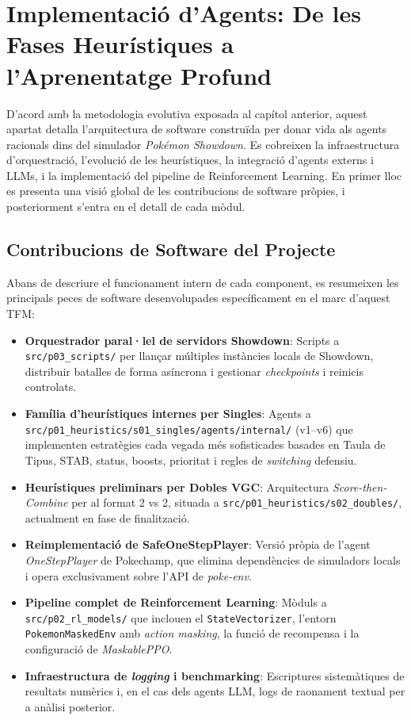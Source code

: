 \chapter{Implementació d'Agents: De les Fases Heurístiques a l'Aprenentatge Profund}
\label{chap:implementacio}

D'acord amb la metodologia evolutiva exposada al capítol anterior, aquest apartat detalla l'arquitectura de software construïda per donar vida als agents racionals dins del simulador \textit{Pokémon Showdown}. Es cobreixen la infraestructura d'orquestració, l'evolució de les heurístiques, la integració d'agents externs i LLMs, i la implementació del pipeline de Reinforcement Learning. En primer lloc es presenta una visió global de les contribucions de software pròpies, i posteriorment s'entra en el detall de cada mòdul.

\section{Contribucions de Software del Projecte}

Abans de descriure el funcionament intern de cada component, es resumeixen les principals peces de software desenvolupades específicament en el marc d'aquest TFM:

\begin{itemize}
    \item \textbf{Orquestrador paral·lel de servidors Showdown}: Scripts a \texttt{src/p03\_scripts/} per llançar múltiples instàncies locals de Showdown, distribuir batalles de forma asíncrona i gestionar \textit{checkpoints} i reinicis controlats.
    \item \textbf{Família d'heurístiques internes per Singles}: Agents a \texttt{src/p01\_heuristics/s01\_singles/agents/internal/} (v1--v6) que implementen estratègies cada vegada més sofisticades basades en Taula de Tipus, STAB, status, boosts, prioritat i regles de \textit{switching} defensiu.
    \item \textbf{Heurístiques preliminars per Dobles VGC}: Arquitectura \textit{Score-then-Combine} per al format 2 vs 2, situada a \texttt{src/p01\_heuristics/s02\_doubles/}, actualment en fase de finalització.
    \item \textbf{Reimplementació de SafeOneStepPlayer}: Versió pròpia de l'agent \textit{OneStepPlayer} de Pokechamp, que elimina dependències de simuladors locals i opera exclusivament sobre l'API de \textit{poke-env}.
    \item \textbf{Pipeline complet de Reinforcement Learning}: Mòduls a \texttt{src/p02\_rl\_models/} que inclouen el \texttt{StateVectorizer}, l'entorn \texttt{PokemonMaskedEnv} amb \textit{action masking}, la funció de recompensa i la configuració de \textit{MaskablePPO}.
    \item \textbf{Infraestructura de \textit{logging} i benchmarking}: Escriptures sistemàtiques de resultats numèrics i, en el cas dels agents LLM, logs de raonament textual per a anàlisi posterior.
\end{itemize}

